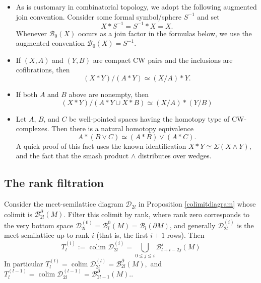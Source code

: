 \documentclass[11pt,a4paper]{article}
\numberwithin{equation}{section}
\theoremstyle{definition}
\theoremstyle{remark}
\newcommand{\pa}{\partial}
\newcommand{\colim}{\operatorname*{colim}}
\newcommand{\BB}{\mathcal B}
\begin{document}
\begin{itemize}
\item As is customary in combinatorial topology, we adopt the following augmented
join convention. Consider some formal symbol/sphere $S^{-1}$ and set
\begin{equation}\label{convention}
X*S^{-1}=S^{-1}*X=X.
\end{equation}
Whenever $\BB_0(X)$ occurs as a join factor in the formulas below, we use the augmented convention $\BB_0(X)=S^{-1}$.
\item If \((X,A)\) and \((Y,B)\) are compact CW pairs and the inclusions are cofibrations, then
\begin{equation}\label{eq:join-quotient-one-sided}
(X*Y)/(A*Y)\simeq (X/A)*Y.
\end{equation}
\item If both \(A\) and \(B\) above are nonempty, then
\begin{equation}\label{eq:join-quotient-two-sided}
(X*Y)/(A*Y\cup X*B) \simeq (X/A)*(Y/B)
\end{equation}
\item Let \(A\), \(B\), and \(C\) be well-pointed spaces having the homotopy
type of CW-complexes. Then there is a natural homotopy equivalence
\begin{equation}\label{joinwedge}
A*(B\vee C)\simeq (A*B)\vee(A*C).
\end{equation}
A quick proof of this fact uses the known identification $\displaystyle
X*Y\simeq \Sigma(X\wedge Y)$,
and the fact that the smash product \(\wedge\) 
distributes over wedges.
\end{itemize} 


\subsection{The rank filtration} 
Consider the meet-semilattice diagram $\mathcal D_{2l} $ in Proposition \ref{colimitdiagram} whose
colimit is $\BB_{2l}^\pa (M)$. Filter this colimit by rank, where rank zero corresponds to the very bottom space $\mathcal D_{2l}^{(0)}=\BB_l^0(M) = \BB_l(\pa M)$, and generally $\mathcal D_{2l}^{(i)}$ is the meet-semilattice up to rank $i$ (that is, the first $i+1$ rows). Then
$$T_l^{(i)} := \colim 
\mathcal D_{2l}^{(i)} 
=
\bigcup_{0\leq j\le i}\BB_{l+i-2j}^{j}(M)$$
In particular
$
T_l^{(l)} = \colim\mathcal D_{2l}^{(l)}= \BB_{2l}^{\pa}(M),
$ and $
T_l^{(l-1)}=\colim\mathcal D_{2l}^{(l-1)}= \BB_{2l-1}^{\pa}(M).
$. 
\end{document}

